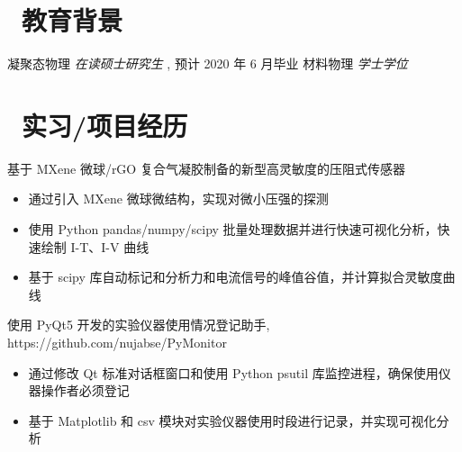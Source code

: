 \documentclass{resume}
\begin{document}


 
\section{\faGraduationCap\  教育背景}
凝聚态物理 \textit{在读硕士研究生} , 预计 2020 年 6 月毕业
材料物理 \textit{学士学位} 

\section{\faUsers\ 实习/项目经历}

\begin{onehalfspacing}
  基于 MXene 微球/rGO 复合气凝胶制备的新型高灵敏度的压阻式传感器
  \begin{itemize}
    \item 通过引入 MXene 微球微结构，实现对微小压强的探测
    \item 使用 Python pandas/numpy/scipy 批量处理数据并进行快速可视化分析，快速绘制 I-T、I-V 曲线
    \item 基于 scipy 库自动标记和分析力和电流信号的峰值谷值，并计算拟合灵敏度曲线
  \end{itemize}
\end{onehalfspacing}

\begin{onehalfspacing}
使用 PyQt5 开发的实验仪器使用情况登记助手, https://github.com/nujabse/PyMonitor
\begin{itemize}
  \item 通过修改 Qt 标准对话框窗口和使用 Python psutil 库监控进程，确保使用仪器操作者必须登记
  \item 基于 Matplotlib 和 csv 模块对实验仪器使用时段进行记录，并实现可视化分析
\end{itemize}
\end{onehalfspacing}
\end{document}
